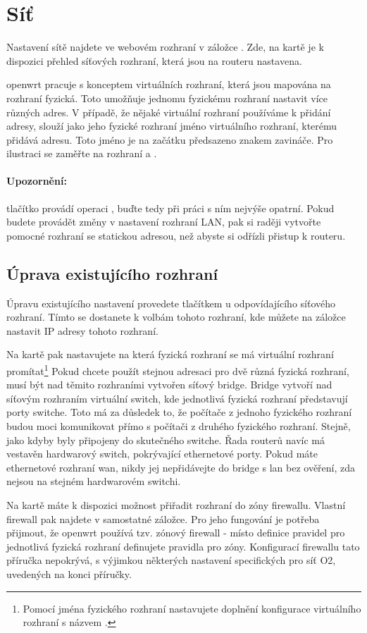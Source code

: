 \section{Síť}
Nastavení sítě najdete ve webovém rozhraní v záložce . Zde,
na kartě  je k dispozici přehled síťových rozhraní, která
jsou na routeru nastavena.

\gls{openwrt} pracuje s konceptem virtuálních rozhraní, která jsou mapována
na rozhraní fyzická. Toto umožňuje jednomu fyzickému rozhraní nastavit více
různých adres. V případě, že nějaké virtuální rozhraní používáme k přidání
adresy, slouží jako jeho fyzické rozhraní jméno virtuálního rozhraní, kterému
přidává adresu. Toto jméno je na začátku předsazeno znakem zavináče. Pro
ilustraci se zaměřte na rozhraní  a .

\paragraph{Upozornění:} tlačítko  provádí operaci ,
buďte tedy při práci s ním nejvýše opatrní. Pokud budete provádět změny v
nastavení rozhraní LAN, pak si raději vytvořte pomocné rozhraní se statickou
adresou, než abyste si odřízli přistup k routeru.

\subsection{Úprava existujícího rozhraní}
Úpravu existujícího nastavení provedete tlačítkem  u odpovídajícího
síťového rozhraní. Tímto se dostanete k volbám tohoto rozhraní, kde můžete
na záložce  nastavit IP adresy tohoto rozhraní.

Na kartě  pak nastavujete na která fyzická rozhraní
se má virtuální rozhraní promítat\footnote{Pomocí jména fyzického rozhraní
 nastavujete doplnění konfigurace virtuálního rozhraní
s názvem .} Pokud chcete použít stejnou adresaci pro dvě
různá fyzická rozhraní, musí být nad těmito rozhraními vytvořen síťový
bridge. Bridge vytvoří nad síťovým rozhraním virtuální switch, kde
jednotlivá fyzická rozhraní představují porty switche. Toto má za důsledek
to, že počítače z jednoho fyzického rozhraní budou moci komunikovat přímo
s počítači z druhého fyzického rozhraní. Stejně, jako kdyby byly připojeny
do skutečného switche. Řada routerů navíc má vestavěn hardwarový switch,
pokrývající ethernetové porty. Pokud máte ethernetové rozhraní \gls{wan},
nikdy jej nepřidávejte do bridge s \gls{lan} bez ověření, zda nejsou na
stejném hardwarovém switchi.

Na kartě  máte k dispozici možnost přiřadit rozhraní do zóny
firewallu. Vlastní firewall pak najdete v samostatné záložce. Pro jeho fungování
je potřeba přijmout, že openwrt používá tzv. zónový firewall - místo definice
pravidel pro jednotlivá fyzická rozhraní definujete pravidla pro zóny.
Konfigurací firewallu tato příručka nepokrývá, s výjimkou některých nastavení
specifických pro síť O2, uvedených na konci příručky.



